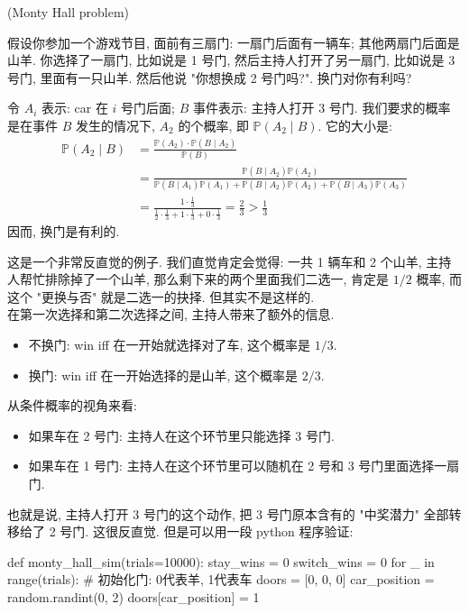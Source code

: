 \begin{example}{(Monty Hall problem)}

假设你参加一个游戏节目, 面前有三扇门: 一扇门后面有一辆车; 其他两扇门后面是山羊. 你选择了一扇门, 比如说是 1 号门, 然后主持人打开了另一扇门, 比如说是 3 号门, 里面有一只山羊. 然后他说 "你想换成 2 号门吗?". 换门对你有利吗?
\begin{solution}
令 \(A_i\) 表示: car 在 \(i\) 号门后面; \(B\) 事件表示: 主持人打开 3 号门. 我们要求的概率是在事件 \(B\) 发生的情况下, \(A_2\) 的个概率, 即 \(\mathbb{P}(A_2 \mid B)\). 它的大小是:
\begin{align*}
\mathbb{P}(A_2 \mid B) &= \frac{\mathbb{P}(A_2) \cdot \mathbb{P}(B \mid A_2)}{\mathbb{P}(B)} \\
&= \frac{\mathbb{P}(B \mid A_2)\mathbb{P}(A_2)}{\mathbb{P}(B\mid A_1)\mathbb{P}(A_1) + \mathbb{P}(B\mid A_2)\mathbb{P}(A_2) + \mathbb{P}(B\mid A_3)\mathbb{P}(A_3)}    \\
&= \frac{1 \cdot \frac{1}{3}}{\frac{1}{2} \cdot \frac{1}{3} + 1 \cdot \frac{1}{3} + 0 \cdot \frac{1}{3}} = \frac{2}{3} > \frac{1}{3}
\end{align*}
因而, 换门是有利的.
\end{solution}
\begin{remark}
这是一个非常反直觉的例子. 我们直觉肯定会觉得: 一共 1 辆车和 2 个山羊, 主持人帮忙排除掉了一个山羊, 
那么剩下来的两个里面我们二选一, 肯定是 $1/2$ 概率, 而这个 "更换与否" 就是二选一的抉择. 但其实不是这样的. \\
在第一次选择和第二次选择之间, 主持人带来了额外的信息. 
\begin{itemize}
    \item 不换门: win iff 在一开始就选择对了车, 这个概率是 $1/3$.
    \item 换门: win iff 在一开始选择的是山羊, 这个概率是 $2/3$.
\end{itemize}
从条件概率的视角来看: 
\begin{itemize}
    \item 如果车在 2 号门: 主持人在这个环节里只能选择 3 号门.
    \item 如果车在 1 号门: 主持人在这个环节里可以随机在 2 号和 3 号门里面选择一扇门.
\end{itemize}
也就是说, 主持人打开 3 号门的这个动作, 把 3 号门原本含有的 "中奖潜力" 全部转移给了 2 号门.
这很反直觉. 但是可以用一段 python 程序验证:
\begin{python}[caption={Monty Hall problem simulation}, label=code:montyhall-sim]
def monty_hall_sim(trials=10000):
    stay_wins = 0
    switch_wins = 0
    for _ in range(trials):
        # 初始化门: 0代表羊, 1代表车 
        doors = [0, 0, 0]
        car_position = random.randint(0, 2)
        doors[car_position] = 1
        

\end{python}
\end{remark}
\end{example}
